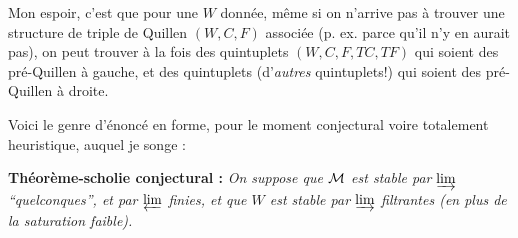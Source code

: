 Mon espoir, c'est que pour une $W$ donnée, même si on n'arrive pas à trouver une structure de triple de Quillen $(W,C,F)$ associée (p. ex. parce qu'il n'y en aurait pas), on peut trouver à la fois des quintuplets $(W,C,F,TC,TF)$ qui soient des pré-Quillen à gauche, et des quintuplets (d'\textit{autres} quintuplets!) qui soient des pré-Quillen à droite.

Voici le genre d'énoncé en forme, pour le moment conjectural voire totalement heuristique, auquel je songe :

\textbf{Théorème-scholie conjectural :} \textit{On suppose que $\mathcal{M}$ est stable par $\varinjlim$ “quelconques”, et par $\varprojlim$ finies, et que $W$ est stable par $\varinjlim$ filtrantes (en plus de la saturation faible).}



